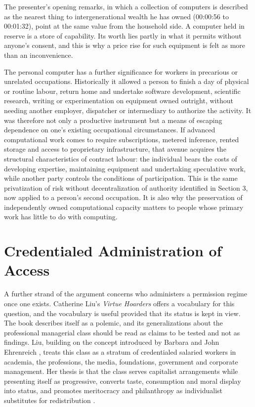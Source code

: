 \documentclass[11pt]{article}
\theoremstyle{plain}
\theoremstyle{definition}
\begin{document}
The presenter's opening remarks, in which a collection of computers is described as the nearest thing to intergenerational wealth he has owned (00:00:56 to 00:01:32), point at the same value from the household side. A computer held in reserve is a store of capability. Its worth lies partly in what it permits without anyone's consent, and this is why a price rise for such equipment is felt as more than an inconvenience.

The personal computer has a further significance for workers in precarious or unrelated occupations. Historically it allowed a person to finish a day of physical or routine labour, return home and undertake software development, scientific research, writing or experimentation on equipment owned outright, without needing another employer, dispatcher or intermediary to authorize the activity. It was therefore not only a productive instrument but a means of escaping dependence on one's existing occupational circumstances. If advanced computational work comes to require subscriptions, metered inference, rented storage and access to proprietary infrastructure, that avenue acquires the structural characteristics of contract labour: the individual bears the costs of developing expertise, maintaining equipment and undertaking speculative work, while another party controls the conditions of participation. This is the same privatization of risk without decentralization of authority identified in Section 3, now applied to a person's second occupation. It is also why the preservation of independently owned computational capacity matters to people whose primary work has little to do with computing.

\section{Credentialed Administration of Access}

A further strand of the argument concerns who administers a permission regime once one exists. Catherine Liu's \emph{Virtue Hoarders} offers a vocabulary for this question, and the vocabulary is useful provided that its status is kept in view. The book describes itself as a polemic, and its generalizations about the professional managerial class should be read as claims to be tested and not as findings. Liu, building on the concept introduced by Barbara and John Ehrenreich \cite{ehrenreich}, treats this class as a stratum of credentialed salaried workers in academia, the professions, the media, foundations, government and corporate management. Her thesis is that the class serves capitalist arrangements while presenting itself as progressive, converts taste, consumption and moral display into status, and promotes meritocracy and philanthropy as individualist substitutes for redistribution \cite{liu}.
\end{document}
